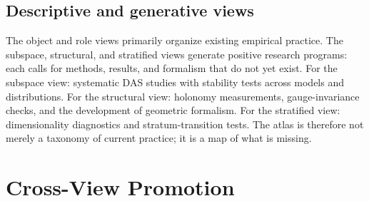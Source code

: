 \documentclass{article}
\begin{document}
\subsection{Descriptive and generative views}

The object and role views primarily organize existing empirical
practice.  The subspace, structural, and stratified views generate
positive research programs: each calls for methods, results, and
formalism that do not yet exist.  For the subspace view: systematic
DAS studies with stability tests across models and distributions.  For
the structural view: holonomy measurements, gauge-invariance checks,
and the development of geometric formalism.  For the stratified view:
dimensionality diagnostics and stratum-transition tests.  The atlas is
therefore not merely a taxonomy of current practice; it is a map of
what is missing.

\section{Cross-View Promotion}\label{sec:promotion}
\end{document}
